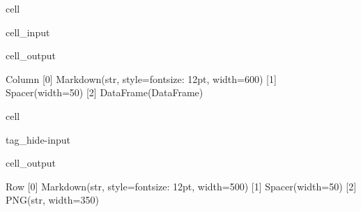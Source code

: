 \documentclass[letterpaper,10pt,english]{jupyterBook}
\begin{document}
\begin{sphinxuseclass}{cell}
\begin{sphinxVerbatimInput}
\begin{sphinxuseclass}{cell_input}
\begin{sphinxVerbatim}[commandchars=\\\{\}]

 
\end{sphinxVerbatim}

\end{sphinxuseclass}\end{sphinxVerbatimInput}
\begin{sphinxVerbatimOutput}

\begin{sphinxuseclass}{cell_output}
\begin{sphinxVerbatim}[commandchars=\\\{\}]
Column
    [0] Markdown(str, style=\PYGZob{}\PYGZsq{}font\PYGZhy{}size\PYGZsq{}: \PYGZsq{}12pt\PYGZsq{}\PYGZcb{}, width=600)
    [1] Spacer(width=50)
    [2] DataFrame(DataFrame)
\end{sphinxVerbatim}

\end{sphinxuseclass}\end{sphinxVerbatimOutput}

\end{sphinxuseclass}
\begin{sphinxuseclass}{cell}
\begin{sphinxuseclass}{tag_hide-input}\begin{sphinxVerbatimOutput}

\begin{sphinxuseclass}{cell_output}
\begin{sphinxVerbatim}[commandchars=\\\{\}]
Row
    [0] Markdown(str, style=\PYGZob{}\PYGZsq{}font\PYGZhy{}size\PYGZsq{}: \PYGZsq{}12pt\PYGZsq{}\PYGZcb{}, width=500)
    [1] Spacer(width=50)
    [2] PNG(str, width=350)
\end{sphinxVerbatim}

\end{sphinxuseclass}\end{sphinxVerbatimOutput}

\end{sphinxuseclass}
\end{sphinxuseclass}
\end{document}
